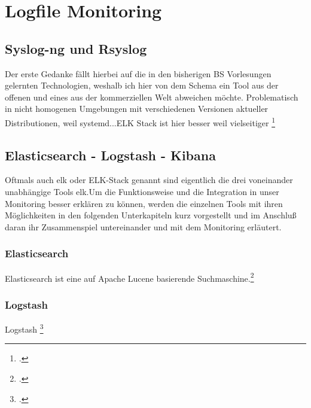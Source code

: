 \documentclass[12pt,a4paper,parskip,listof=totoc,bibliography=totoc]{scrreprt}
\begin{document}
	\section{Logfile Monitoring}
	\subsection{Syslog-ng und Rsyslog}
	Der erste Gedanke fällt hierbei auf die in den bisherigen BS Vorlesungen gelernten Technologien, weshalb ich hier von dem Schema ein Tool aus der offenen und eines aus der kommerziellen Welt abweichen möchte.
	Problematisch in nicht homogenen Umgebungen mit verschiedenen Versionen aktueller Distributionen, weil systemd...ELK Stack ist hier besser weil vielseitiger
	\footcite{systemd2015}
	\subsection{Elasticsearch - Logstash - Kibana}
	Oftmals auch \acrshort{elk} oder ELK-Stack genannt sind eigentlich die drei voneinander unabhängige Tools \acrlong{elk}.Um die Funktionsweise und die Integration in unser Monitoring besser erklären zu können, werden die einzelnen Tools mit ihren Möglichkeiten in den folgenden Unterkapiteln kurz vorgestellt und im Anschluß daran ihr Zusammenspiel untereinander und mit dem Monitoring erläutert.
	\subsubsection{Elasticsearch}
	Elasticsearch ist eine auf Apache Lucene basierende Suchmaschine.\footcite{elasticsearch}
	\subsubsection{Logstash}
	Logstash \footcite{logstash}
\end{document}
